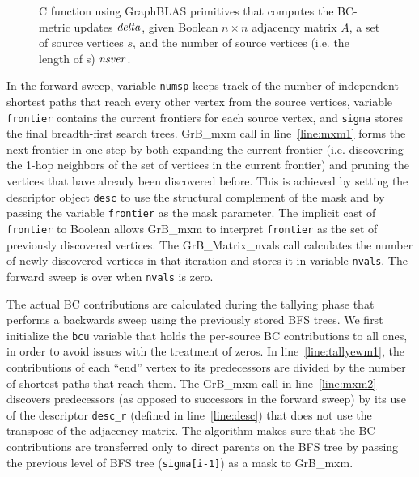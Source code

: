 \begin{figure*}[h]
\caption{C function using GraphBLAS primitives that computes the BC-metric updates ${\it delta}$, given Boolean $n \times n$ adjacency matrix $A$, a set of source vertices $s$, 
and the number of source vertices (i.e. the length of s) ${\it nsver}$.
}
\label{Fig:BClisting}
{\scriptsize

}
\end{figure*}

In the forward sweep, variable {\tt numsp} keeps track of the number of independent shortest paths that reach every other vertex from the source vertices, variable {\tt frontier} contains the current frontiers for each source vertex, and {\tt sigma} stores
the final breadth-first search trees. 
GrB\_mxm call in line~\ref{line:mxm1} forms the next frontier in one step by both expanding the current frontier (i.e. discovering the 1-hop neighbors of the set of vertices in the current frontier) and pruning the vertices that have 
already been discovered before. This is achieved by setting the descriptor object {\tt desc} to use the structural complement of the mask and by passing the 
variable {\tt frontier} as the mask parameter. The implicit cast of {\tt frontier} to Boolean allows GrB\_mxm to interpret {\tt frontier} as the set of previously discovered vertices.
The GrB\_Matrix\_nvals call calculates the number of newly discovered vertices in that iteration and stores it in variable {\tt nvals}. The forward sweep is over when {\tt nvals} is zero.

The actual BC contributions are calculated during the tallying phase that performs a backwards sweep using the previously stored BFS trees. We first initialize the {\tt bcu} variable 
that holds the per-source BC contributions to all ones, in order to avoid issues with the treatment of zeros. In line~\ref{line:tallyewm1}, the contributions of each ``end'' vertex to its 
predecessors are divided by the number of shortest paths that reach them. The GrB\_mxm call in line~\ref{line:mxm2} discovers predecessors (as opposed to successors in
the forward sweep) by its use of the descriptor {\tt desc\_r} (defined in line~\ref{line:desc}) that does not use the transpose of the adjacency matrix. The algorithm makes sure that the BC contributions are transferred only to direct parents on the BFS tree by passing the previous level of BFS tree ({\tt sigma[i-1]}) as a mask to GrB\_mxm.  